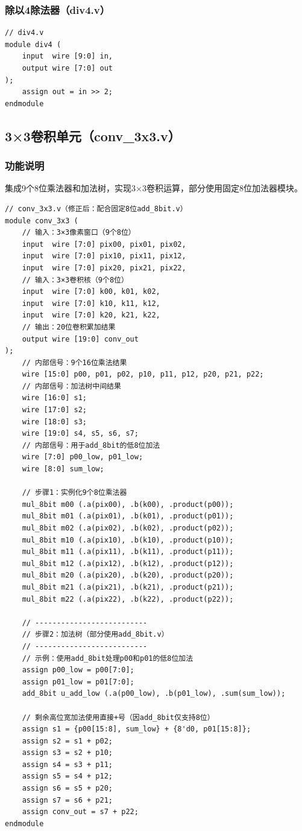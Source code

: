 \documentclass{ctexart}
\begin{document}
\subsubsection{除以4除法器（div4.v）}
\begin{lstlisting}[style=verilog, caption=div4.v]
// div4.v
module div4 (
    input  wire [9:0] in,
    output wire [7:0] out
);
    assign out = in >> 2;
endmodule
\end{lstlisting}

\subsection{3×3卷积单元（conv\_3x3.v）}
\subsubsection{功能说明}
集成9个8位乘法器和加法树，实现3×3卷积运算，部分使用固定8位加法器模块。
\begin{lstlisting}[style=verilog, caption=conv\_3x3.v]
// conv_3x3.v（修正后：配合固定8位add_8bit.v）
module conv_3x3 (
    // 输入：3×3像素窗口（9个8位）
    input  wire [7:0] pix00, pix01, pix02,
    input  wire [7:0] pix10, pix11, pix12,
    input  wire [7:0] pix20, pix21, pix22,
    // 输入：3×3卷积核（9个8位）
    input  wire [7:0] k00, k01, k02,
    input  wire [7:0] k10, k11, k12,
    input  wire [7:0] k20, k21, k22,
    // 输出：20位卷积累加结果
    output wire [19:0] conv_out
);
    // 内部信号：9个16位乘法结果
    wire [15:0] p00, p01, p02, p10, p11, p12, p20, p21, p22;
    // 内部信号：加法树中间结果
    wire [16:0] s1;
    wire [17:0] s2;
    wire [18:0] s3;
    wire [19:0] s4, s5, s6, s7;
    // 内部信号：用于add_8bit的低8位加法
    wire [7:0] p00_low, p01_low;
    wire [8:0] sum_low;

    // 步骤1：实例化9个8位乘法器
    mul_8bit m00 (.a(pix00), .b(k00), .product(p00));
    mul_8bit m01 (.a(pix01), .b(k01), .product(p01));
    mul_8bit m02 (.a(pix02), .b(k02), .product(p02));
    mul_8bit m10 (.a(pix10), .b(k10), .product(p10));
    mul_8bit m11 (.a(pix11), .b(k11), .product(p11));
    mul_8bit m12 (.a(pix12), .b(k12), .product(p12));
    mul_8bit m20 (.a(pix20), .b(k20), .product(p20));
    mul_8bit m21 (.a(pix21), .b(k21), .product(p21));
    mul_8bit m22 (.a(pix22), .b(k22), .product(p22));

    // --------------------------
    // 步骤2：加法树（部分使用add_8bit.v）
    // --------------------------
    // 示例：使用add_8bit处理p00和p01的低8位加法
    assign p00_low = p00[7:0];
    assign p01_low = p01[7:0];
    add_8bit u_add_low (.a(p00_low), .b(p01_low), .sum(sum_low));
    
    // 剩余高位宽加法使用直接+号（因add_8bit仅支持8位）
    assign s1 = {p00[15:8], sum_low} + {8'd0, p01[15:8]};
    assign s2 = s1 + p02;
    assign s3 = s2 + p10;
    assign s4 = s3 + p11;
    assign s5 = s4 + p12;
    assign s6 = s5 + p20;
    assign s7 = s6 + p21;
    assign conv_out = s7 + p22;
endmodule
\end{lstlisting}
\end{document}
